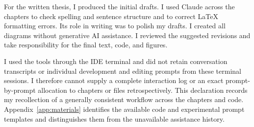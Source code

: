 For the written thesis, I produced the initial drafts. I used Claude across the chapters to check spelling and sentence structure and to correct LaTeX formatting errors. Its role in writing was to polish my drafts. I created all diagrams without generative AI assistance. I reviewed the suggested revisions and take responsibility for the final text, code, and figures.

I used the tools through the IDE terminal and did not retain conversation transcripts or individual development and editing prompts from these terminal sessions. I therefore cannot supply a complete interaction log or an exact prompt-by-prompt allocation to chapters or files retrospectively. This declaration records my recollection of a generally consistent workflow across the chapters and code. Appendix~\ref{app:materials} identifies the available code and experimental prompt templates and distinguishes them from the unavailable assistance history.
